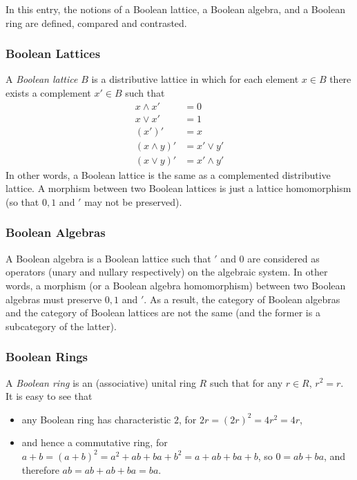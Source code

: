 \documentclass[12pt]{article}
\begin{document}
In this entry, the notions of a Boolean lattice, a Boolean algebra, and a Boolean ring are defined, compared and contrasted.

\subsubsection*{Boolean Lattices}

A \emph{Boolean lattice} $B$ is a distributive lattice in which for each element $x\in B$ there exists a complement $x'\in B$ such that
\begin{align*}
x \land x'&=0\\
x \lor x'&=1 \\
(x')'&=x \\
(x \land y)'&=x'\lor y'\\
(x \lor y)'&=x'\land y'
\end{align*}
In other words, a Boolean lattice is the same as a complemented distributive lattice.  A morphism between two Boolean lattices is just a lattice homomorphism (so that $0,1$ and $'$ may not be preserved).

\subsubsection*{Boolean Algebras}

A Boolean algebra is a Boolean lattice such that $'$ and $0$ are considered as operators (unary and nullary respectively) on the algebraic system.  In other words, a morphism (or a Boolean algebra homomorphism) between two Boolean algebras must preserve $0,1$ and $'$.  As a result, the category of Boolean algebras and the category of Boolean lattices are not the same (and the former is a subcategory of the latter).

\subsubsection*{Boolean Rings}

A \emph{Boolean ring} is an (associative) unital ring $R$ such that for any $r\in R$, $r^2=r$.  It is easy to see that 
\begin{itemize}
\item any Boolean ring has characteristic $2$, for $2r=(2r)^2=4r^2=4r$,
\item and hence a commutative ring, for $a+b=(a+b)^2=a^2+ab+ba+b^2=a+ab+ba+b$, so $0=ab+ba$, and therefore $ab=ab+ab+ba=ba$.
\end{itemize}
\end{document}
